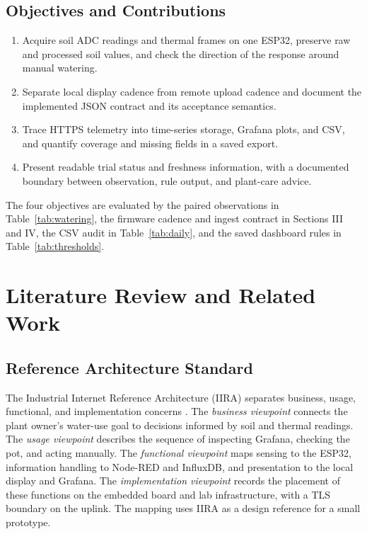 \documentclass{ieeeaccess}
\begin{document}
\subsection{Objectives and Contributions}
\begin{enumerate}
\item Acquire soil ADC readings and thermal frames on one ESP32, preserve raw and processed soil values, and check the direction of the response around manual watering.
\item Separate local display cadence from remote upload cadence and document the implemented JSON contract and its acceptance semantics.
\item Trace HTTPS telemetry into time-series storage, Grafana plots, and CSV, and quantify coverage and missing fields in a saved export.
\item Present readable trial status and freshness information, with a documented boundary between observation, rule output, and plant-care advice.
\end{enumerate}
The four objectives are evaluated by the paired observations in Table~\ref{tab:watering}, the firmware cadence and ingest contract in Sections III and IV, the CSV audit in Table~\ref{tab:daily}, and the saved dashboard rules in Table~\ref{tab:thresholds}.

\section{Literature Review and Related Work}
\subsection{Reference Architecture Standard}
The Industrial Internet Reference Architecture (IIRA) separates business, usage, functional, and implementation concerns \cite{iira}. The \emph{business viewpoint} connects the plant owner's water-use goal to decisions informed by soil and thermal readings. The \emph{usage viewpoint} describes the sequence of inspecting Grafana, checking the pot, and acting manually. The \emph{functional viewpoint} maps sensing to the ESP32, information handling to Node-RED and InfluxDB, and presentation to the local display and Grafana. The \emph{implementation viewpoint} records the placement of these functions on the embedded board and lab infrastructure, with a TLS boundary on the uplink. The mapping uses IIRA as a design reference for a small prototype.
\end{document}
